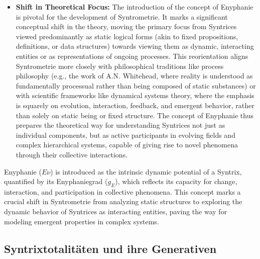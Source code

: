 \documentclass[12pt]{article}
\newcommand{\q}[1]{\enquote{#1}}
\newcommand{\enyphaniegrad}{g_E}
\begin{document}
\begin{itemize}
\begin{itemize}
    \end{itemize}
    A Syntrix with a higher Enyphaniegrad (\(\enyphaniegrad\)) would thus possess a greater propensity for undergoing internal change, for engaging in interactions with its environment or other Syntrices, or for contributing to the emergence of collective behaviors within an ensemble. Heim summarizes this by stating (paraphrased from SM p. 62): \q{Der Enyphaniegrad ist ein Maß für die Fähigkeit einer Syntrix, an kollektiven Phänomenen teilzunehmen.} (The Enyphaniegrad is a measure of the ability of a Syntrix to participate in collective phenomena.)
    \item \textbf{Shift in Theoretical Focus:} The introduction of the concept of Enyphanie is pivotal for the development of Syntrometrie. It marks a significant conceptual shift in the theory, moving the primary focus from Syntrices viewed predominantly as static logical forms (akin to fixed propositions, definitions, or data structures) towards viewing them as dynamic, interacting entities or as representations of ongoing processes. This reorientation aligns Syntrometrie more closely with philosophical traditions like process philosophy (e.g., the work of A.N. Whitehead, where reality is understood as fundamentally processual rather than being composed of static substances) or with scientific frameworks like dynamical systems theory, where the emphasis is squarely on evolution, interaction, feedback, and emergent behavior, rather than solely on static being or fixed structure. The concept of Enyphanie thus prepares the theoretical way for understanding Syntrices not just as individual components, but as active participants in evolving fields and complex hierarchical systems, capable of giving rise to novel phenomena through their collective interactions.
\end{itemize}

Enyphanie (\(E\nu\)) is introduced as the intrinsic dynamic potential of a Syntrix, quantified by its Enyphaniegrad (\(\enyphaniegrad\)), which reflects its capacity for change, interaction, and participation in collective phenomena. This concept marks a crucial shift in Syntrometrie from analyzing static structures to exploring the dynamic behavior of Syntrices as interacting entities, paving the way for modeling emergent properties in complex systems.

\subsection{Syntrixtotalitäten und ihre Generativen}
\label{sec:totalitaeten}
\end{document}
